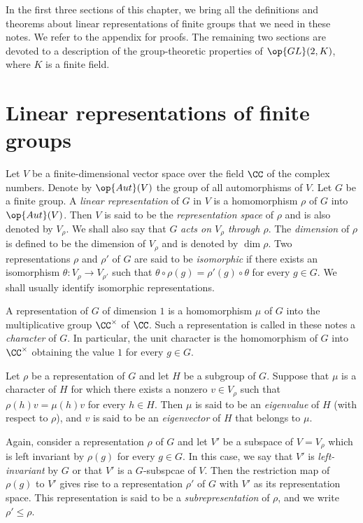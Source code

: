 \documentclass[../main.tex]{subfiles}
\begin{document}
In the first three sections of this chapter, we bring all the definitions and theorems about linear representations of finite groups that we need in these notes. We refer to the appendix for proofs. The remaining two sections are devoted to a description of the group-theoretic properties of $\op{GL}(2,K)$, where $K$ is a finite field.

\section{Linear representations of finite groups} \label{sec:intro-line-reps}
Let $V$ be a finite-dimensional vector space over the field $\CC$ of the complex numbers. Denote by $\op{Aut}(V)$ the group of all automorphisms of $V$. Let $G$ be a finite group. A \textit{linear representation} of $G$ in $V$ is a homomorphism $\rho$ of $G$ into $\op{Aut}(V)$. Then $V$ is said to be the \textit{representation space} of $\rho$ and is also denoted by $V_\rho$. We shall also say that $G$ \textit{acts on $V_\rho$ through $\rho$}. The \textit{dimension} of $\rho$ is defined to be the dimension of $V_\rho$ and is denoted by $\dim\rho$. Two representations $\rho$ and $\rho'$ of $G$ are said to be \textit{isomorphic} if there exists an isomorphism $\theta\colon V_\rho\to V_{\rho'}$ such that $\theta\circ\rho(g)=\rho'(g)\circ\theta$ for every $g\in G$. We shall usually identify isomorphic representations.

A representation of $G$ of dimension $1$ is a homomorphism $\mu$ of $G$ into the multiplicative group $\CC^\times$ of $\CC$. Such a representation is called in these notes a \textit{character} of $G$. In particular, the unit character is the homomorphism of $G$ into $\CC^\times$ obtaining the value $1$ for every $g\in G$.

Let $\rho$ be a representation of $G$ and let $H$ be a subgroup of $G$. Suppose that $\mu$ is a character of $H$ for which there exists a nonzero $v\in V_\rho$ such that $\rho(h)v=\mu(h)v$ for every $h\in H$. Then $\mu$ is said to be an \textit{eigenvalue} of $H$ (with respect to $\rho$), and $v$ is said to be an \textit{eigenvector} of $H$ that belongs to $\mu$.

Again, consider a representation $\rho$ of $G$ and let $V'$ be a subspace of $V=V_\rho$ which is left invariant by $\rho(g)$ for every $g\in G$. In this case, we say that $V'$ is \textit{left-invariant} by $G$ or that $V'$ is a $G$-subspcae of $V$. Then the restriction map of $\rho(g)$ to $V'$ gives rise to a representation $\rho'$ of $G$ with $V'$ as its representation space. This representation is said to be a \textit{subrepresentation} of $\rho$, and we write $\rho'\le\rho$.
\end{document}
